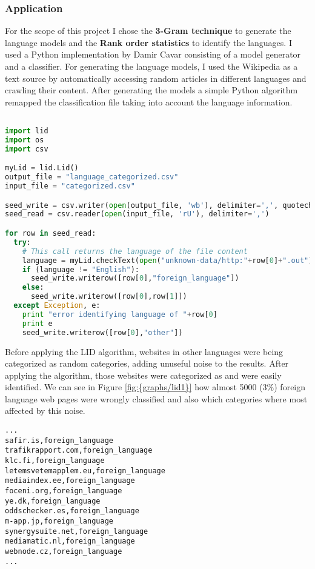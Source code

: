 \subsubsection{Application}
For the scope of this project I chose the {\bf 3-Gram technique} to generate the language models and the {\bf Rank order statistics} to identify the languages. I used a Python implementation by Damir 
Cavar\cite{lid1} consisting of a model generator and a classifier.
For generating the language models, I used the Wikipedia as a text source by automatically accessing random articles in different languages and crawling their content. 
After generating the models a simple Python algorithm remapped the classification file taking into account the language information.

\begin{lstlisting}[language=Python]

import lid
import os
import csv

myLid = lid.Lid()
output_file = "language_categorized.csv"
input_file = "categorized.csv"

seed_write = csv.writer(open(output_file, 'wb'), delimiter=',', quotechar='|', quoting=csv.QUOTE_MINIMAL)
seed_read = csv.reader(open(input_file, 'rU'), delimiter=',')

for row in seed_read:
  try:
    # This call returns the language of the file content
    language = myLid.checkText(open("unknown-data/http:"+row[0]+".out").read())
    if (language != "English"):
      seed_write.writerow([row[0],"foreign_language"])
    else:
      seed_write.writerow([row[0],row[1]])
  except Exception, e:
    print "error identifying language of "+row[0]
    print e
    seed_write.writerow([row[0],"other"])
\end{lstlisting}

Before applying the LID algorithm, websites in other languages were being categorized as random categories, adding unuseful noise to the results. After applying the algorithm, those websites were 
categorized as  and were easily identified. We can see in Figure \ref{fig:{graphs/lid1}} how almost 5000 (3\%) foreign language web pages were wrongly classified and also which
categories where most affected by this noise.


\begin{lstlisting}
...
safir.is,foreign_language
trafikrapport.com,foreign_language
klc.fi,foreign_language
letemsvetemapplem.eu,foreign_language
mediaindex.ee,foreign_language
foceni.org,foreign_language
ye.dk,foreign_language
oddschecker.es,foreign_language
m-app.jp,foreign_language
synergysuite.net,foreign_language
mediamatic.nl,foreign_language
webnode.cz,foreign_language
...
\end{lstlisting}
